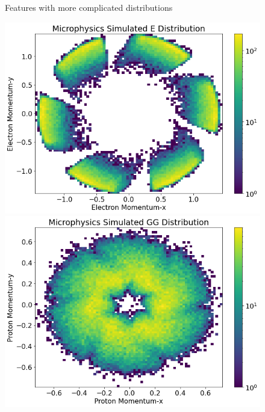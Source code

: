 \begin{figure}[!ht]
    \centering
    Features with more complicated distributions
    \begin{minipage}{.4\textwidth}
    
        \centering
        \includegraphics[width=.9\textwidth,trim={0 0 0 .875cm},clip]{pictures/milestoneR2/pxpy/epxpy.png}
        \includegraphics[width=.9\textwidth,trim={0 0 0 .875cm},clip]{pictures/milestoneR2/pxpy/ppxpy.png}
    \end{minipage}%
    \begin{minipage}{0.4\textwidth}
    

\end{minipage}
\end{figure}
